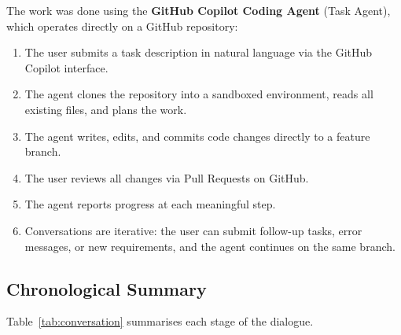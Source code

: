 \documentclass[11pt, a4paper]{article}
\begin{document}
The work was done using the \textbf{GitHub Copilot Coding Agent} (Task Agent),
which operates directly on a GitHub repository:

\begin{enumerate}[noitemsep]
  \item The user submits a task description in natural language via the
        GitHub Copilot interface.
  \item The agent clones the repository into a sandboxed environment, reads all
        existing files, and plans the work.
  \item The agent writes, edits, and commits code changes directly to a feature
        branch.
  \item The user reviews all changes via Pull Requests on GitHub.
  \item The agent reports progress at each meaningful step.
  \item Conversations are iterative: the user can submit follow-up tasks, error
        messages, or new requirements, and the agent continues on the same
        branch.
\end{enumerate}

\subsection{Chronological Summary}

Table~\ref{tab:conversation} summarises each stage of the dialogue.
\end{document}
